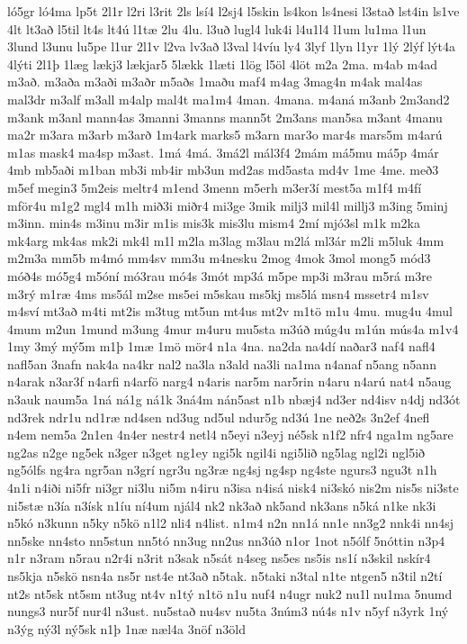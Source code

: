 {ló5gr
ló4ma
lp5t
2l1r
l2ri
l3rit
2ls
lsí4
l2sj4
l5skin
ls4kon
ls4nesi
l3stað
lst4in
ls1ve
4lt
lt3að
l5til
lt4s
lt4ú
l1tæ
2lu
4lu.
l3uð
lugl4
luk4i
l4u1l4
l1um
lu1ma
l1un
3lund
l3unu
lu5pe
l1ur
2l1v
l2va
lv3að
l3val
l4víu
ly4
3lyf
1lyn
l1yr
1lý
2lýf
lýt4a
4lýti
2l1þ
1læg
lækj3
lækjar5
5lækk
1læti
1lög
l5öl
4löt
m2a
2ma.
m4ab
m4ad
m3að.
m3aða
m3aði
m3aðr
m5aðs
1maðu
maf4
m4ag
3mag4n
m4ak
mal4as
mal3dr
m3alf
m3all
m4alp
mal4t
ma1m4
4man.
4mana.
m4aná
m3anb
2m3and2
m3ank
m3anl
mann4as
3manni
3manns
mann5t
2m3ans
man5sa
m3ant
4manu
ma2r
m3ara
m3arb
m3arð
1m4ark
marks5
m3arn
mar3o
mar4s
mars5m
m4arú
m1as
mask4
ma4sp
m3ast.
1má
4má.
3má2l
mál3f4
2mám
má5mu
má5p
4már
4mb
mb5aði
m1ban
mb3i
mb4ir
mb3un
md2as
md5asta
md4v
1me
4me.
með3
m5ef
megin3
5m2eis
meltr4
m1end
3menn
m5erh
m3er3í
mest5a
m1f4
m4fí
mför4u
m1g2
mgl4
m1h
mið3i
miðr4
mi3ge
3mik
milj3
mil4l
millj3
m3ing
5minj
m3inn.
min4s
m3inu
m3ir
m1is
mis3k
mis3lu
mism4
2mí
mjó3sl
m1k
m2ka
mk4arg
mk4as
mk2i
mk4l
m1l
m2la
m3lag
m3lau
m2lá
ml3ár
m2li
m5luk
4mm
m2m3a
mm5b
m4mó
mm4sv
mm3u
m4nesku
2mog
4mok
3mol
mong5
mód3
móð4s
mó5g4
m5óní
mó3rau
mó4s
3mót
mp3á
m5pe
mp3i
m3rau
m5rá
m3re
m3rý
m1ræ
4ms
ms5ál
m2se
ms5ei
m5skau
ms5kj
ms5lá
msn4
mssetr4
m1sv
m4sví
mt3að
m4ti
mt2is
m3tug
mt5un
mt4us
mt2v
m1tö
m1u
4mu.
mug4u
4mul
4mum
m2un
1mund
m3ung
4mur
m4uru
mu5sta
m3úð
múg4u
m1ún
mús4a
m1v4
1my
3mý
mý5m
m1þ
1mæ
1mö
mör4
n1a
4na.
na2da
na4dí
naðar3
naf4
nafl4
nafl5an
3nafn
nak4a
na4kr
nal2
na3la
n3ald
na3li
na1ma
n4anaf
n5ang
n5ann
n4arak
n3ar3f
n4arfi
n4arfö
narg4
n4aris
nar5m
nar5rin
n4aru
n4arú
nat4
n5aug
n3auk
naum5a
1ná
ná1g
ná1k
3ná4m
nán5ast
n1b
nbæj4
nd3er
nd4isv
n4dj
nd3ót
nd3rek
ndr1u
nd1ræ
nd4sen
nd3ug
nd5ul
ndur5g
nd3ú
1ne
neð2s
3n2ef
4nefl
n4em
nem5a
2n1en
4n4er
nestr4
netl4
n5eyi
n3eyj
né5sk
n1f2
nfr4
nga1m
ng5are
ng2as
n2ge
ng5ek
n3ger
n3get
ng1ey
ngi5k
ngil4i
ngi5lið
ng5lag
ngl2i
ngl5ið
ng5ólfs
ng4ra
ngr5an
n3grí
ngr3u
ng3ræ
ng4sj
ng4sp
ng4ste
ngurs3
ngu3t
n1h
4n1i
n4iði
ni5fr
ni3gr
ni3lu
ni5m
n4iru
n3isa
n4isá
nisk4
ni3skó
nis2m
nis5s
ni3ste
ni5stæ
n3ía
n3ísk
n1íu
ní4um
njál4
nk2
nk3að
nk5and
nk3ans
n5ká
n1ke
nk3i
n5kó
n3kunn
n5ky
n5kö
n1l2
nli4
n4list.
n1m4
n2n
nn1á
nn1e
nn3g2
nnk4i
nn4sj
nn5ske
nn4sto
nn5stun
nn5tó
nn3ug
nn2us
nn3úð
n1or
1not
n5ólf
5nóttin
n3p4
n1r
n3ram
n5rau
n2r4i
n3rit
n3sak
n5sát
n4seg
ns5es
ns5is
ns1í
n3skil
nskír4
ns5kja
n5skö
nsn4a
ns5r
nst4e
nt3að
n5tak.
n5taki
n3tal
n1te
ntgen5
n3til
n2tí
nt2s
nt5sk
nt5sm
nt3ug
nt4v
n1tý
n1tö
n1u
nuf4
n4ugr
nuk2
nu1l
nu1ma
5numd
nungs3
nur5f
nur4l
n3ust.
nu5stað
nu4sv
nu5ta
3núm3
nú4s
n1v
n5yf
n3yrk
1ný
n3ýg
ný3l
ný5sk
n1þ
1næ
næl4a
3nöf
n3öld
}
